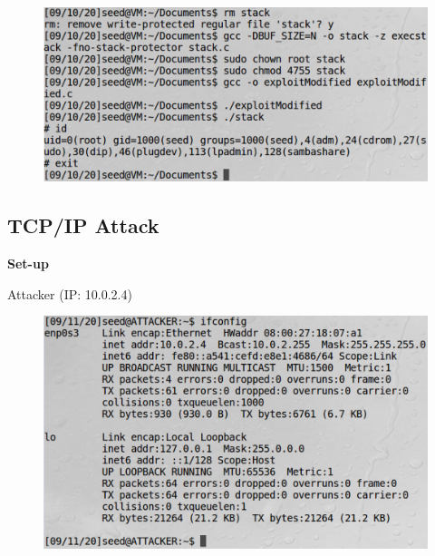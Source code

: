 \documentclass[12pt]{article}
\begin{document}
\begin{figure}[H]
    \centering
    \includegraphics[width=1\textwidth]{bf-exploit-modified.png}
\end{figure}



\newpage

\subsection{TCP/IP Attack}

\vspace{0.5in}

\begin{center}
    \textbf{Set-up}
\end{center}

\begin{center}
    Attacker (IP: 10.0.2.4)
\end{center}

\begin{figure}[H]
    \centering
    \includegraphics[width=1\textwidth]{tcp-attacker-config.png}
\end{figure}
\end{document}
